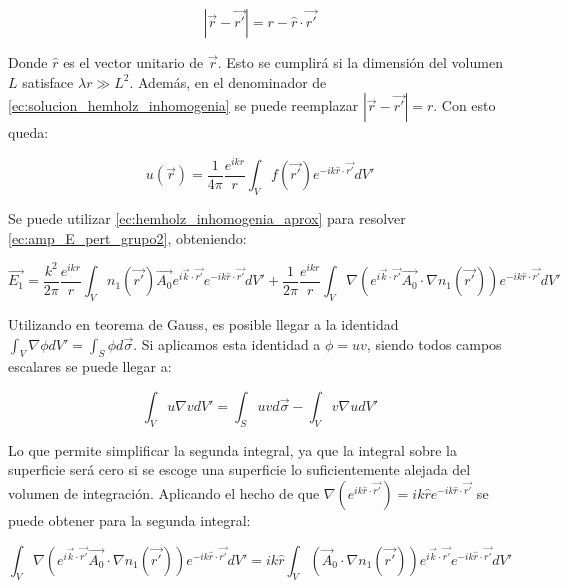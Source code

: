 \begin{equation}
    |\vec{r}- \vec{r'}| = r -\hat{r} \cdot \vec{r'}
\end{equation}

Donde $\hat{r}$ es el vector unitario de $\vec{r}$. Esto se cumplirá si la dimensión del volumen $L$ satisface $\lambda r \gg L^2$. Además, en el denominador de \ref{ec:solucion_hemholz_inhomogenia} se puede reemplazar $|\vec{r}- \vec{r'}| = r$. Con esto queda:

\begin{equation}\label{ec:hemholz_inhomogenia_aprox}
    u(\vec{r}) = \frac{1}{4\pi} \frac{e^{ikr}}{r} \int_V f(\vec{r'}) e^{-ik\hat{r} \cdot \vec{r'}} dV'
\end{equation}

Se puede utilizar \ref{ec:hemholz_inhomogenia_aprox} para resolver \ref{ec:amp_E_pert_grupo2}, obteniendo:

\begin{equation}
    \vec{E_1} = \frac{k^2}{2\pi} \frac{e^{ikr}}{r} \int_V n_1(\vec{r'}) \vec{A_0}e^{i\vec{k}\cdot\vec{r'}} e^{-ik\hat{r} \cdot \vec{r'}} dV' + \frac{1}{2\pi} \frac{e^{ikr}}{r} \int_V \nabla(e^{i\vec{k}\cdot\vec{r'}} \vec{A_0}\cdot \nabla n_1(\vec{r'})) e^{-ik\hat{r} \cdot \vec{r'}} dV'
\end{equation}

Utilizando en teorema de Gauss, es posible llegar a la identidad $\int_V \nabla \phi dV'= \int_S \phi  d\vec{\sigma}$. Si aplicamos esta identidad a $\phi = uv$, siendo todos campos escalares se puede llegar a: 

\begin{equation}
    \int_V u\nabla v dV' = \int_S uvd\vec{\sigma} - \int_V v\nabla u dV'
\end{equation}

Lo que permite simplificar la segunda integral, ya que la integral sobre la superficie será cero si se escoge una superficie lo suficientemente alejada del volumen de integración. Aplicando el hecho de que $\nabla(e^{ik\hat{r} \cdot \vec{r'}}) = ik \hat{r} e^{-ik\hat{r} \cdot \vec{r'}}$ se puede obtener para la segunda integral:

\begin{equation}
    \int_V \nabla(e^{i\vec{k}\cdot\vec{r'}} \vec{A_0}\cdot \nabla n_1(\vec{r'})) e^{-ik\hat{r} \cdot \vec{r'}} dV' = ik \hat{r} \int_V (\vec{A}_0 \cdot \nabla n_1(\vec{r'})) e^{i\vec{k}\cdot\vec{r'}}e^{-ik\hat{r} \cdot \vec{r'}} dV'
\end{equation}


